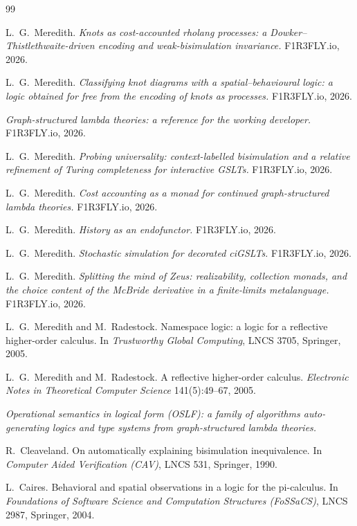\documentclass[11pt]{article}
\theoremstyle{plain}
\theoremstyle{definition}
\begin{document}
\begin{thebibliography}{99}

 L.\ G.\ Meredith. \emph{Knots as cost-accounted rholang processes: a
Dowker--Thistlethwaite-driven encoding and weak-bisimulation invariance.} F1R3FLY.io, 2026.

 L.\ G.\ Meredith. \emph{Classifying knot diagrams with a spatial--behavioural
logic: a logic obtained for free from the encoding of knots as processes.} F1R3FLY.io, 2026.

 \emph{Graph-structured lambda theories: a reference for the working developer.}
F1R3FLY.io, 2026.

 L.\ G.\ Meredith. \emph{Probing universality: context-labelled bisimulation and a
relative refinement of Turing completeness for interactive GSLTs.} F1R3FLY.io, 2026.

 L.\ G.\ Meredith. \emph{Cost accounting as a monad for continued graph-structured
lambda theories.} F1R3FLY.io, 2026.

 L.\ G.\ Meredith. \emph{History as an endofunctor.} F1R3FLY.io, 2026.

 L.\ G.\ Meredith. \emph{Stochastic simulation for decorated ciGSLTs.} F1R3FLY.io,
2026.

 L.\ G.\ Meredith. \emph{Splitting the mind of Zeus: realizability, collection monads,
and the choice content of the McBride derivative in a finite-limits metalanguage.} F1R3FLY.io, 2026.

 L.\ G.\ Meredith and M.\ Radestock. Namespace logic: a logic for a reflective
higher-order calculus. In \emph{Trustworthy Global Computing}, LNCS 3705, Springer, 2005.

 L.\ G.\ Meredith and M.\ Radestock. A reflective higher-order calculus. \emph{Electronic
Notes in Theoretical Computer Science} 141(5):49--67, 2005.

 \emph{Operational semantics in logical form (OSLF): a family of algorithms
auto-generating logics and type systems from graph-structured lambda theories.}

 R.\ Cleaveland. On automatically explaining bisimulation inequivalence. In
\emph{Computer Aided Verification (CAV)}, LNCS 531, Springer, 1990.

 L.\ Caires. Behavioral and spatial observations in a logic for the pi-calculus. In
\emph{Foundations of Software Science and Computation Structures (FoSSaCS)}, LNCS 2987, Springer, 2004.


\end{thebibliography}
\end{document}
